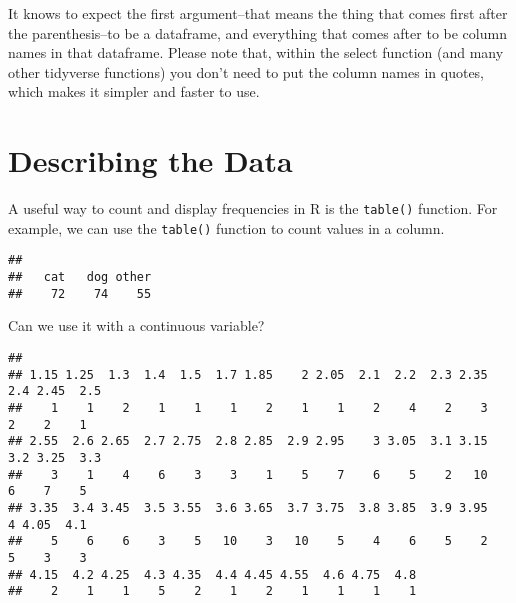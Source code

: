 \documentclass[
]{article}
\newenvironment{Shaded}{\begin{snugshade}}{\end{snugshade}}
\newcommand{\FunctionTok}[1]{\textcolor[rgb]{0.13,0.29,0.53}{\textbf{#1}}}
\newcommand{\NormalTok}[1]{#1}
\newcommand{\SpecialCharTok}[1]{\textcolor[rgb]{0.81,0.36,0.00}{\textbf{#1}}}
\begin{document}
It knows to expect the first argument--that means the thing that comes
first after the parenthesis--to be a dataframe, and everything that
comes after to be column names in that dataframe. Please note that,
within the select function (and many other tidyverse functions) you
don't need to put the column names in quotes, which makes it simpler and
faster to use.

\hypertarget{describing-the-data}{%
\section{Describing the Data}\label{describing-the-data}}

A useful way to count and display frequencies in R is the
\texttt{table()} function. For example, we can use the \texttt{table()}
function to count values in a column.

\begin{Shaded}
\end{Shaded}

\begin{verbatim}
## 
##   cat   dog other 
##    72    74    55
\end{verbatim}

Can we use it with a continuous variable?

\begin{Shaded}
\end{Shaded}

\begin{verbatim}
## 
## 1.15 1.25  1.3  1.4  1.5  1.7 1.85    2 2.05  2.1  2.2  2.3 2.35  2.4 2.45  2.5 
##    1    1    2    1    1    1    2    1    1    2    4    2    3    2    2    1 
## 2.55  2.6 2.65  2.7 2.75  2.8 2.85  2.9 2.95    3 3.05  3.1 3.15  3.2 3.25  3.3 
##    3    1    4    6    3    3    1    5    7    6    5    2   10    6    7    5 
## 3.35  3.4 3.45  3.5 3.55  3.6 3.65  3.7 3.75  3.8 3.85  3.9 3.95    4 4.05  4.1 
##    5    6    6    3    5   10    3   10    5    4    6    5    2    5    3    3 
## 4.15  4.2 4.25  4.3 4.35  4.4 4.45 4.55  4.6 4.75  4.8 
##    2    1    1    5    2    1    2    1    1    1    1
\end{verbatim}
\end{document}
